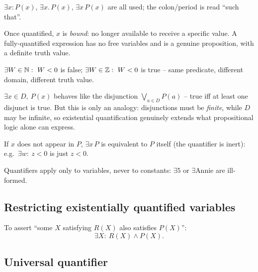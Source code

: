 \documentclass[11pt]{article}
\begin{document}
\begin{note}[Punctuation]
$\exists x : P(x)$, $\exists x.\, P(x)$, $\exists x\, P(x)$ are all used; the colon/period is read ``such that''.
\end{note}

\begin{definition}
Once quantified, $x$ is \emph{bound}: no longer available to receive a specific value. A fully-quantified expression has no free variables and is a genuine proposition, with a definite truth value.
\end{definition}

\begin{note}
$\exists W\in\mathbb{N}:\ W<0$ is false; $\exists W\in\mathbb{Z}:\ W<0$ is true -- same predicate, different domain, different truth value.
\end{note}

\begin{note}
$\exists x \in D,\ P(x)$ behaves like the disjunction $\bigvee_{a\in D} P(a)$ -- true iff at least one disjunct is true. But this is only an analogy: disjunctions must be \emph{finite}, while $D$ may be infinite, so existential quantification genuinely extends what propositional logic alone can express.
\end{note}

\begin{note}
If $x$ does not appear in $P$, $\exists x\, P$ is equivalent to $P$ itself (the quantifier is inert): e.g.\ $\exists w:\ z<0$ is just $z<0$.
\end{note}

\begin{note}
Quantifiers apply only to variables, never to constants: $\exists 5$ or $\exists\text{Annie}$ are ill-formed.
\end{note}

\subsection{Restricting existentially quantified variables}
\label{sec:5-7}

\begin{note}
To assert ``some $X$ satisfying $R(X)$ also satisfies $P(X)$'':
\[
\exists X:\ R(X) \wedge P(X).
\]
\end{note}

\subsection{Universal quantifier}
\label{sec:5-8}
\end{document}
